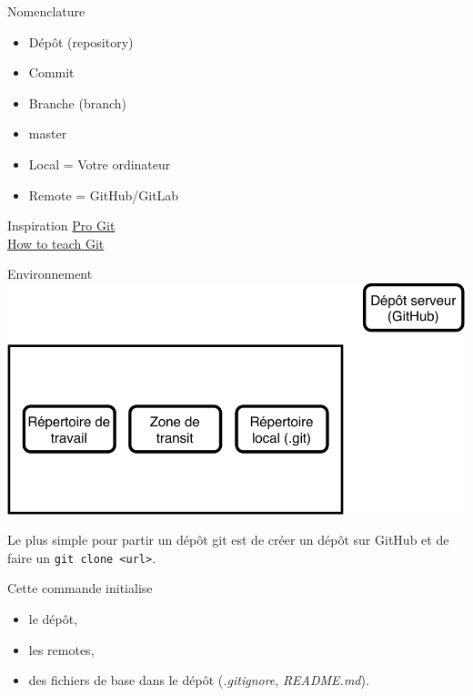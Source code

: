 \documentclass[11pt]{beamer}
\begin{document}
\begin{frame}{Nomenclature}
	\begin{itemize}
		\item Dépôt (repository)
		\item Commit
		\item Branche (branch)
		\item master
		\item Local = Votre ordinateur
		\item Remote = GitHub/GitLab
	\end{itemize}
\end{frame}

\begin{frame}{Inspiration}
\centering
\href{https://git-scm.com/book/en/v2}{Pro Git} \\
\href{https://rachelcarmena.github.io/2018/12/12/how-to-teach-git.html}{How to teach Git}
\end{frame}

\begin{frame}{Environnement}
	\includegraphics[width=0.95\linewidth,height=0.95\textheight,keepaspectratio]{env.pdf}
\end{frame}

\begin{frame}[fragile]
	Le plus simple pour partir un dépôt git est de créer un dépôt sur GitHub et de faire un \verb|git clone <url>|.
	
	Cette commande initialise 
	\begin{itemize}[<+->]
		\item le dépôt,
		\item les remotes,
		\item des fichiers de base dans le dépôt (\textit{.gitignore}, \textit{README.md}).
	\end{itemize}
\end{frame}
\end{document}

